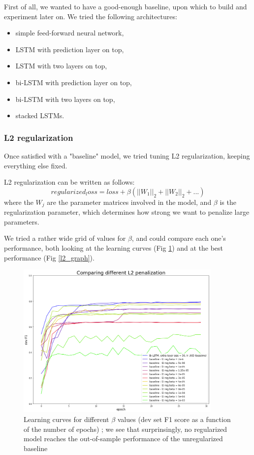 \documentclass{article} %
\begin{document}
First of all, we wanted to have a good-enough baseline, upon which to build and experiment later on. We tried the following architectures:
\begin{itemize}
\item simple feed-forward neural network,
\item LSTM with prediction layer on top,
\item LSTM with two layers on top,
\item bi-LSTM with prediction layer on top,
\item bi-LSTM with two layers on top,
\item stacked LSTMs.
\end{itemize}



\subsubsection{L2 regularization}

Once satisfied with a "baseline" model, we tried tuning L2 regularization, keeping everything else fixed.

L2 regularization can be written as follows: $$regularized_loss = loss + \beta (||W_1||_2+||W_2||_2+...)$$ where the $W_j$ are the parameter matrices involved in the model, and $\beta$ is the regularization parameter, which determines how strong we want to penalize large parameters.

We tried a rather wide grid of values for $\beta$, and could compare each one's performance, both looking at the learning curves (Fig \ref{l2_devf1}) and at the best performance (Fig \ref{l2_graph}).


\begin{figure}
\begin{center}
\includegraphics[width=380px]{figs/l2_devf1.png}
\caption{Learning curves for different $\beta$ values (dev set F1 score as a function of the number of epochs) ; we see that surprinsingly, no regularized model reaches the out-of-sample performance of the unregularized baseline}
\label{l2_devf1}
\end{center}
\end{figure}
\end{document}
